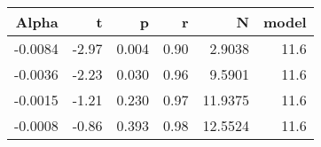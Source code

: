 \begin{table}[ht]
\centering
\begin{tabular}{rrrrrr}
  \hline
Alpha & t & p & r & N & model \\ 
  \hline
-0.0084 & -2.97 & 0.004 & 0.90 & 2.9038 & 11.6 \\ 
  -0.0036 & -2.23 & 0.030 & 0.96 & 9.5901 & 11.6 \\ 
  -0.0015 & -1.21 & 0.230 & 0.97 & 11.9375 & 11.6 \\ 
  -0.0008 & -0.86 & 0.393 & 0.98 & 12.5524 & 11.6 \\ 
   \hline
\end{tabular}
\end{table}

